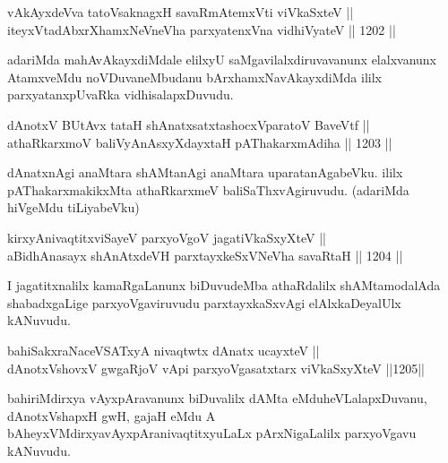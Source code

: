 \begin{shl}
vAkAyxdeVva tatoV\s saknagxH savaRmAtemxVti viVkaSxteV || \\
iteyxVtadAbxrXhamxNeVneVha parxyatenxVna vidhiVyateV \hfill || 1202 ||  
\end{shl}

\begin{artha}
adariMda mahAvAkayxdiMdale elilxyU saMgavilalxdiruvavanunx elalxvanunx AtamxveMdu noVDuvaneMbudanu bArxhamxNavAkayxdiMda ililx parxyatanxpUvaRka vidhisalapxDuvudu.
\end{artha}

\begin{shl}
dAnotxV BUtAvx tataH shAnatxsatxtashocxVparatoV BaveVtf ||  \\
athaRkarxmoV baliVyAnAsxyXdayxtaH pAThakarxmAdiha \hfill || 1203 ||  
\end{shl}


\begin{artha}
dAnatxnAgi anaMtara shAMtanAgi anaMtara uparatanAgabeVku. ililx pAThakarxmakikxMta athaRkarxmeV baliSaThxvAgiruvudu. (adariMda hiVgeMdu tiLiyabeVku)
\end{artha}


\begin{shl}
kirxyAnivaqtitxviSayeV parxyoVgoV jagatiVkaSxyXteV || \\
aBidhAnasayx shAnAtxdeVH parxtayxkeSxVNeVha savaRtaH \hfill || 1204 ||  
\end{shl}

\begin{artha}
I jagatitxnalilx kamaRgaLanunx biDuvudeMba athaRdalilx shAMtamodalAda shabadxgaLige parxyoVgaviruvudu parxtayxkaSxvAgi elAlx\break kaDeyalUlx kANuvudu.
\end{artha}


\begin{shl}
bahiSakxraNaceVSATxyA nivaqtwtx dAnatx ucayxteV || \\
dAnotxV\s shovxV gwgaRjoV vA\s pi parxyoVgasatxtarx viVkaSxyXteV \hfill ||1205||  
\end{shl}

\begin{artha}
bahiriMdirxya vAyxpAravanunx biDuvalilx dAMta eMdu\break heVLalapxDuvanu, dAnotxV\s shapxH gwH, gajaH eMdu A bAheyxVMdirxya\-\break vAyxpAranivaqtitxyuLaLx pArxNigaLalilx parxyoVgavu kANuvudu.
\end{artha}

